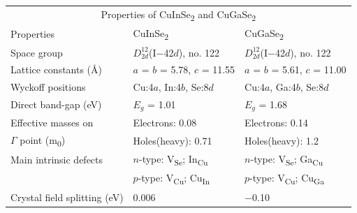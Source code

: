 \documentclass[a4paper, 12pt, titlepage,oneside,drop]{kthesis}
\begin{document}
\vspace{10cm}

\begin {table}[!htb]
\centering
\begin{tabular}{l l l}  
\toprule
\toprule
\multicolumn{3}{c}{\large Properties of CuInSe\textsubscript{2} and CuGaSe\textsubscript{2}}  \\  
\cellcolor{blue!25} Properties & \cellcolor{blue!25} CuInSe\textsubscript{2} & \cellcolor{blue!25} CuGaSe\textsubscript{2} \\ 

Space group & $D_{2d}^{12}$(I$-$42$d$), no. 122 \cite{madelung2004semiconductors} & $D_{2d}^{12}$(I$-$42$d$), no. 122 \cite{madelung2004semiconductors}\\ 
\rowcolor[gray]{0.9}
Lattice constants (Å) & $a$ = $b$ = 5.78, $c$ = 11.55 \cite{madelung2004semiconductors} & $a$ = $b$ = 5.61, $c$ = 11.00 \cite{madelung2004semiconductors}\\ 
Wyckoff positions & Cu:4$a$, In:4$b$, Se:8$d$ \cite{parlak2006ab, hones2008polarization,persson2008anisotropic}& Cu:4$a$, Ga:4$b$, Se:8$d$ \cite{parlak2006ab, hones2008polarization,persson2008anisotropic}\\ 
\rowcolor[gray]{0.9}
Direct band-gap (eV) & $E_g$ = 1.01 \cite{madelung2004semiconductors} & $E_g$ = 1.68 \cite{madelung2004semiconductors}\\ 
Effective masses on  & Electrons: 0.08 \cite{rau2006wide}& Electrons: 0.14 \cite{rau2006wide} \\ 
 $\Gamma$ point (m\textsubscript{0})                                     & Holes(heavy): 0.71 \cite{rau2006wide}& Holes(heavy): 1.2 \cite{rau2006wide} \\ 
\rowcolor[gray]{0.9}
Main intrinsic defects & $n$-type: V\textsubscript{Se}; In\textsubscript{Cu} \cite{chen2010intrinsic, schuler2004self, lany2008intrinsic, zhang1998defect}&  $n$-type: V\textsubscript{Se}; Ga\textsubscript{Cu} \cite{chen2010intrinsic, schuler2004self, lany2008intrinsic, zhang1998defect}\\
\rowcolor[gray]{0.9}   & $p$-type: V\textsubscript{Cu}; Cu\textsubscript{In} \cite{chen2010intrinsic, schuler2004self, lany2008intrinsic, zhang1998defect}&  $p$-type: V\textsubscript{Cu}; Cu\textsubscript{Ga} \cite{chen2010intrinsic, schuler2004self, lany2008intrinsic, zhang1998defect} \\  
Crystal field splitting (eV)& 0.006 \cite{madelung2004semiconductors} & $-$0.10 \cite{madelung2010springer}\\ 

\end{tabular}
\end{table}
\end{document}
